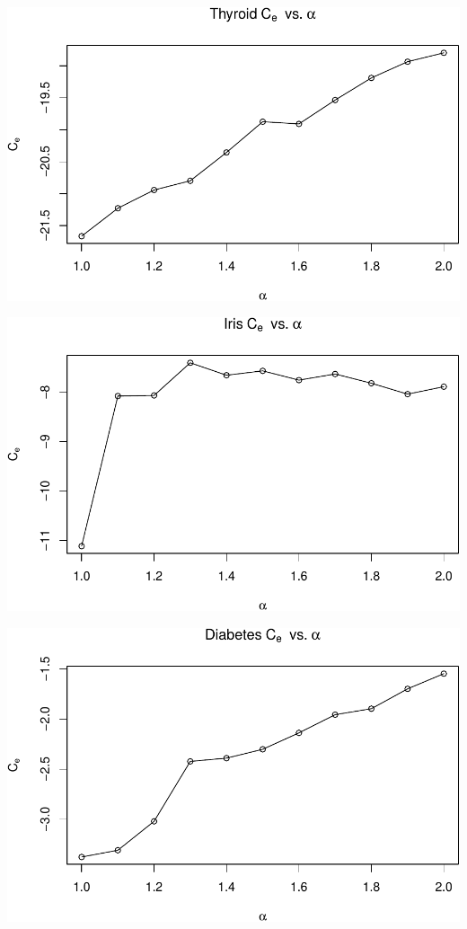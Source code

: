 \begin{center}\includegraphics[width=1\linewidth]{Report_files/figure-latex/unnamed-chunk-22-1} \end{center}

\begin{center}\includegraphics[width=1\linewidth]{Report_files/figure-latex/unnamed-chunk-22-2} \end{center}

\begin{center}\includegraphics[width=1\linewidth]{Report_files/figure-latex/unnamed-chunk-22-3} \end{center}

